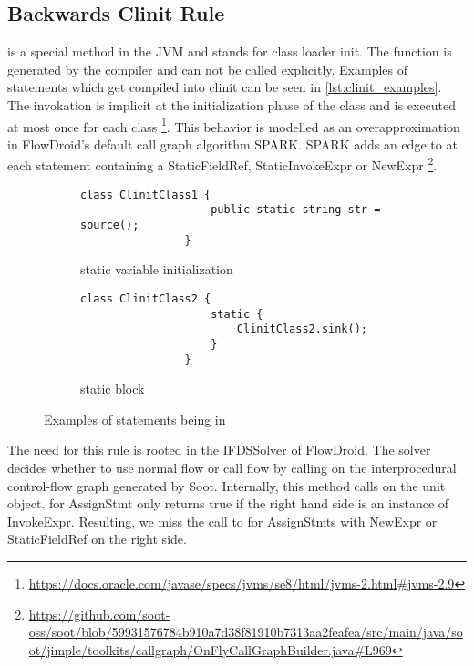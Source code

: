 \documentclass[../draft.tex]{subfiles}
\begin{document}
    \subsection{Backwards Clinit Rule}
     is a special method in the JVM and stands for class loader init. The function is generated by the compiler and can not be called explicitly. Examples of statements which get compiled into clinit can be seen in \autoref{lst:clinit_examples}. The invokation is implicit at the initialization phase of the class and is executed at most once for each class \footnote{\url{https://docs.oracle.com/javase/specs/jvms/se8/html/jvms-2.html\#jvms-2.9}}. 
    This behavior is modelled as an overapproximation in FlowDroid's default call graph algorithm SPARK. SPARK adds an edge to  at each statement containing a StaticFieldRef, StaticInvokeExpr or NewExpr \footnote{\url{https://github.com/soot-oss/soot/blob/59931576784b910a7d38f81910b7313aa2feafea/src/main/java/soot/jimple/toolkits/callgraph/OnFlyCallGraphBuilder.java\#L969}}.
   
    \begin{figure}[ht]
        \centering
        \begin{subfigure}[b]{0.45\textwidth}
            \centering
            \begin{lstlisting}[gobble=16]
                class ClinitClass1 {
                    public static string str = source();
                }
            \end{lstlisting}
            \caption{static variable initialization}
            \label{lst:clinit_examples_a}
        \end{subfigure}
        \hfill
        \begin{subfigure}[b]{0.45\textwidth}
            \centering
            \begin{lstlisting}[gobble=16]
                class ClinitClass2 {
                    static {
                        ClinitClass2.sink();
                    }
                }
            \end{lstlisting}
            \caption{static block}
            \label{lst:clinit_examples_b}
        \end{subfigure}
        \caption{Examples of statements being in }
        \label{lst:clinit_examples}
    \end{figure}


    The need for this rule is rooted in the IFDSSolver of FlowDroid. The solver decides whether to use normal flow or call flow by calling  on the interprocedural control-flow graph generated by Soot. Internally, this method calls  on the unit object.  for AssignStmt only returns true if the right hand side is an instance of InvokeExpr. Resulting, we miss the call to  for AssignStmts with NewExpr or StaticFieldRef on the right side.
\end{document}
